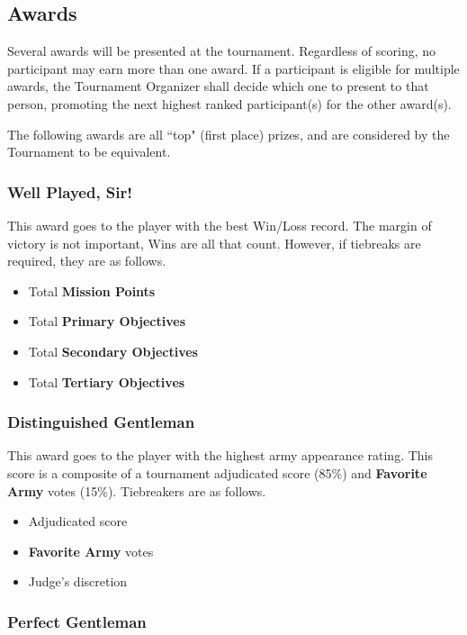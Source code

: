 \documentclass[10pt,titlepage]{article}
\begin{document}
\subsection*{Awards}

Several awards will be presented at the tournament. Regardless of scoring, no participant may earn more than one award. If a participant is eligible for multiple awards, the Tournament Organizer shall decide which one to present to that person, promoting the next highest ranked participant(s) for the other award(s).

The following awards are all ``top" (first place) prizes, and are considered by the Tournament to be equivalent.

\subsubsection*{Well Played, Sir!}

This award goes to the player with the best Win/Loss record. The margin of victory is not important, Wins are all that count. However, if tiebreaks are required, they are as follows.

\begin{itemize}
\item Total \textbf{Mission Points}
\item Total \textbf{Primary Objectives}
\item Total \textbf{Secondary Objectives}
\item Total \textbf{Tertiary Objectives}
\end{itemize}

\subsubsection*{Distinguished Gentleman}

This award goes to the player with the highest army appearance rating. This score is a composite of a tournament adjudicated score (85\%) and \textbf{Favorite Army} votes (15\%). Tiebreakers are as follows.

\begin{itemize}
\item Adjudicated score
\item \textbf{Favorite Army} votes
\item Judge's discretion
\end{itemize}

\subsubsection*{Perfect Gentleman}
\end{document}
